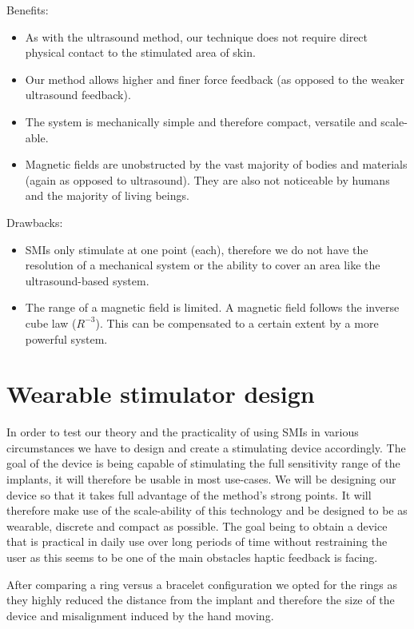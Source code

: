 \documentclass[10pt,journal,compsoc]{IEEEtran}
\begin{document}
	Benefits:
	
	\begin{itemize}
		\item As with the ultrasound method, our technique does not require direct physical contact to the stimulated area of skin.
		\item Our method allows higher and finer force feedback (as opposed to the weaker ultrasound feedback).
		\item The system is mechanically simple and therefore compact, versatile and scale-able.
		\item Magnetic fields are unobstructed by the vast majority of bodies and materials (again as opposed to ultrasound). They are also not noticeable by humans and the majority of living beings.
	\end{itemize}
	
	Drawbacks:
	
	\begin{itemize}
		\item SMIs only stimulate at one point (each), therefore we do not have the resolution of a mechanical system or the ability to cover an area like the ultrasound-based system.
		\item The range of a magnetic field is limited. A magnetic field follows the inverse cube law ($ R ^ {- 3} $). This can be compensated to a certain extent by a more powerful system.
	\end{itemize}
	
\section{Wearable stimulator design}
In order to test our theory and the practicality of using SMIs in various circumstances we have to design and create a stimulating device accordingly. The goal of the device is being capable of stimulating the full sensitivity range of the implants, it will therefore be usable in most use-cases.
We will be designing our device so that it takes full advantage of the method's strong points. It will therefore make use of the scale-ability of this technology and be designed to be as wearable, discrete and compact as possible. The goal being to obtain a device that is practical in daily use over long periods of time without restraining the user as this seems to be one of the main obstacles haptic feedback is facing.

After comparing a ring versus a bracelet configuration we opted for the rings as they highly reduced the distance from the implant and therefore the size of the device and misalignment induced by the hand moving.
\end{document}
